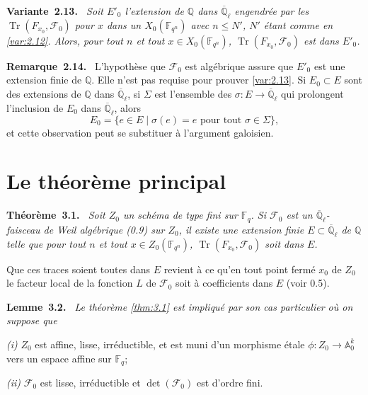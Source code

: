 \documentclass[10pt,a4paper]{article}
\makeatletter
\theoremstyle{plain}
\theoremstyle{definition}
\newenvironment{manualblock}[4]{%
  \par\medskip\noindent\textbf{#1~#2#3.}\def\@currentlabel{#2}\label{#4}\itshape\ }{\par\normalfont\medskip}
\newenvironment{manualremark}[4]{%
  \par\medskip\noindent\textbf{#1~#2#3.}\def\@currentlabel{#2}\label{#4}\ }{\par\medskip}
\DeclareMathOperator{\tr}{Tr}
\makeatother
\begin{document}
\begin{manualblock}{Variante}{2.13}{}{var:2.13}
Soit $E'_0$ l'extension de $\mathbb{Q}$ dans $\overline{\mathbb{Q}}_\ell$ engendr\'ee par les $\tr(F_{x_0}, \mathcal{F}_0)$ pour $x$ dans un $X_0(\mathbb{F}_{q^n})$ avec $n \leq N'$, $N'$ \'etant comme en \ref{var:2.12}. Alors, pour tout $n$ et tout $x \in X_0(\mathbb{F}_{q^n})$, $\tr(F_{x_0}, \mathcal{F}_0)$ est dans $E'_0$.
\end{manualblock}

\begin{manualremark}{Remarque}{2.14}{}{rem:2.14}
L'hypoth\`ese que $\mathcal{F}_0$ est alg\'ebrique assure que $E'_0$ est une extension finie de $\mathbb{Q}$. Elle n'est pas requise pour prouver \ref{var:2.13}. Si $E_0 \subset E$ sont des extensions de $\mathbb{Q}$ dans $\overline{\mathbb{Q}}_\ell$, si $\Sigma$ est l'ensemble des $\sigma: E \to \overline{\mathbb{Q}}_\ell$ qui prolongent l'inclusion de $E_0$ dans $\overline{\mathbb{Q}}_\ell$, alors
\[
E_0 = \{e \in E \mid \sigma(e) = e \text{ pour tout } \sigma \in \Sigma\},
\]
et cette observation peut se substituer \`a l'argument galoisien.
\end{manualremark}

\section{Le th\'eor\`eme principal}

\begin{manualblock}{Théorème}{3.1}{}{thm:3.1}
Soit $Z_0$ un sch\'ema de type fini sur $\mathbb{F}_q$. Si $\mathcal{F}_0$ est un $\overline{\mathbb{Q}}_\ell$-faisceau de Weil alg\'ebrique (0.9) sur $Z_0$, il existe une extension finie $E \subset \overline{\mathbb{Q}}_\ell$ de $\mathbb{Q}$ telle que pour tout $n$ et tout $x \in Z_0(\mathbb{F}_{q^n})$, $\tr(F_{x_0}, \mathcal{F}_0)$ soit dans $E$.
\end{manualblock}

Que ces traces soient toutes dans $E$ revient \`a ce qu'en tout point ferm\'e $x_0$ de $Z_0$ le facteur local de la fonction $L$ de $\mathcal{F}_0$ soit \`a coefficients dans $E$ (voir 0.5).

\begin{manualblock}{Lemme}{3.2}{}{lem:3.2}
Le th\'eor\`eme \ref{thm:3.1} est impliqu\'e par son cas particulier o\`u on suppose que

\emph{(i)} $Z_0$ est affine, lisse, irr\'eductible, et est muni d'un morphisme \'etale $\phi: Z_0 \to \mathbb{A}_0^{k}$ vers un espace affine sur $\mathbb{F}_q$;

\emph{(ii)} $\mathcal{F}_0$ est lisse, irr\'eductible et $\det(\mathcal{F}_0)$ est d'ordre fini.
\end{manualblock}
\end{document}
